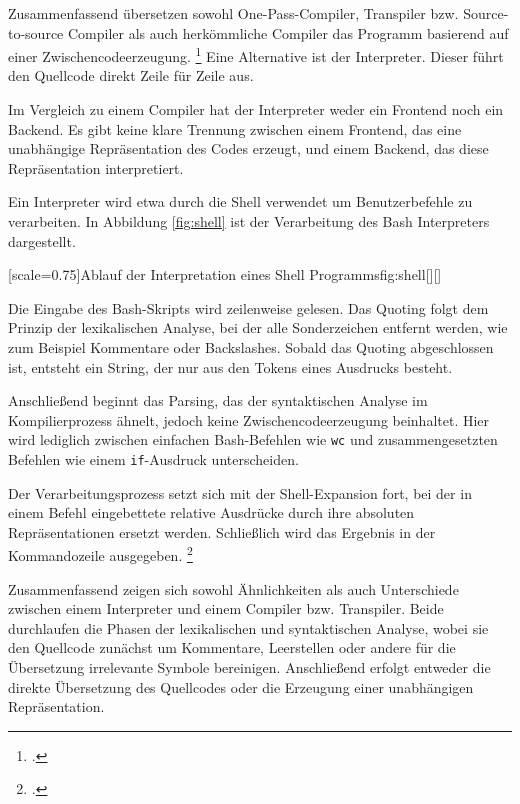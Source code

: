 Zusammenfassend übersetzen sowohl One-Pass-Compiler, Transpiler bzw. Source-to-source Compiler als auch herkömmliche Compiler das Programm basierend auf einer Zwischencodeerzeugung. \footcite[Vgl. ][S. 18ff. ]{assambly}
Eine Alternative ist der Interpreter. Dieser führt den Quellcode direkt Zeile für Zeile aus.

Im Vergleich zu einem Compiler hat der Interpreter weder ein Frontend noch ein Backend. Es gibt keine klare Trennung zwischen einem Frontend, das eine unabhängige Repräsentation des Codes erzeugt, und einem Backend, das diese Repräsentation interpretiert. 

Ein Interpreter wird etwa durch die Shell verwendet um Benutzerbefehle zu verarbeiten. 
In Abbildung \ref{fig:shell} ist der Verarbeitung des Bash Interpreters dargestellt.


[scale=0.75]{Ablauf der Interpretation eines Shell Programms}{fig:shell}[][]
\pagebreak

Die Eingabe des Bash-Skripts wird zeilenweise gelesen.
Das Quoting folgt dem Prinzip der lexikalischen Analyse, bei der alle Sonderzeichen entfernt werden, wie zum Beispiel Kommentare oder Backslashes. Sobald das Quoting abgeschlossen ist, entsteht ein String, der nur aus den Tokens eines Ausdrucks besteht.

Anschließend beginnt das Parsing, das der syntaktischen Analyse im Kompilierprozess ähnelt, jedoch keine Zwischencodeerzeugung beinhaltet. Hier wird lediglich zwischen einfachen Bash-Befehlen wie \verb+wc+ und zusammengesetzten Befehlen wie einem \verb+if+-Ausdruck unterscheiden.

Der Verarbeitungsprozess setzt sich mit der Shell-Expansion fort, bei der in einem Befehl eingebettete relative Ausdrücke durch ihre absoluten Repräsentationen ersetzt werden.
Schließlich wird das Ergebnis in der Kommandozeile ausgegeben. \footcite[Vgl. ][]{gnubash}


Zusammenfassend zeigen sich sowohl Ähnlichkeiten als auch Unterschiede zwischen einem Interpreter und einem Compiler bzw. Transpiler. Beide durchlaufen die Phasen der lexikalischen und syntaktischen Analyse, wobei sie den Quellcode zunächst um Kommentare, Leerstellen oder andere für die Übersetzung irrelevante Symbole bereinigen. Anschließend erfolgt entweder die direkte Übersetzung des Quellcodes oder die Erzeugung einer unabhängigen Repräsentation.

